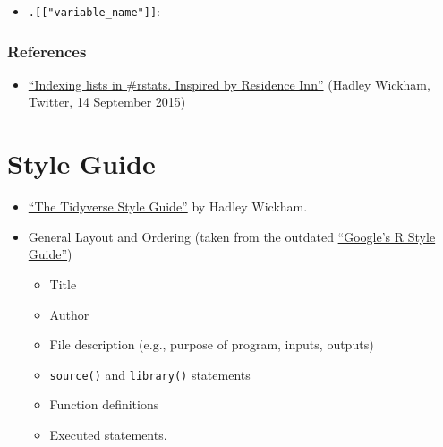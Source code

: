 \documentclass[
]{book}
\newenvironment{Shaded}{\begin{snugshade}}{\end{snugshade}}
\newcommand{\KeywordTok}[1]{\textcolor[rgb]{0.13,0.29,0.53}{\textbf{#1}}}
\newcommand{\NormalTok}[1]{#1}
\newcommand{\OperatorTok}[1]{\textcolor[rgb]{0.81,0.36,0.00}{\textbf{#1}}}
\newcommand{\StringTok}[1]{\textcolor[rgb]{0.31,0.60,0.02}{#1}}
\providecommand{\tightlist}{%
  \setlength{\itemsep}{0pt}\setlength{\parskip}{0pt}}
\begin{document}
\begin{itemize}
\tightlist
\item
  \texttt{.{[}{[}"variable\_name"{]}{]}}:
\end{itemize}

\begin{Shaded}
\end{Shaded}

\hypertarget{references-1}{%
\subsubsection{References}\label{references-1}}

\begin{itemize}
\tightlist
\item
  \href{https://twitter.com/hadleywickham/status/643381054758363136}{``Indexing lists in \#rstats. Inspired by Residence Inn''} (Hadley Wickham, Twitter, 14 September 2015)
\end{itemize}

\hypertarget{style-guide}{%
\section{Style Guide}\label{style-guide}}

\begin{itemize}
\tightlist
\item
  \href{https://style.tidyverse.org/}{``The Tidyverse Style Guide''} by Hadley Wickham.
\item
  General Layout and Ordering (taken from the outdated \href{http://web.stanford.edu/class/cs109l/unrestricted/resources/google-style.html}{``Google's R Style Guide''})

  \begin{itemize}
  \tightlist
  \item
    Title
  \item
    Author
  \item
    File description (e.g., purpose of program, inputs, outputs)
  \item
    \texttt{source()} and \texttt{library()} statements
  \item
    Function definitions
  \item
    Executed statements.
  \end{itemize}
\end{itemize}
\end{document}
